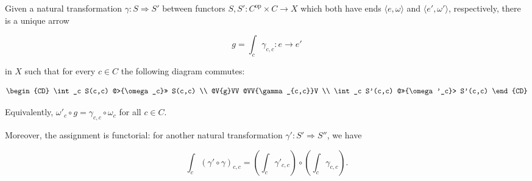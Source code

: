 Given a natural transformation $\gamma: S \Rightarrow S'$ between functors $S, S': C^{\mathrm{op}} \times C \to X$ which both have ends $\langle e, \omega \rangle$ and $\langle e', \omega' \rangle$, respectively, there is a unique arrow

$$g = \int_c \gamma_{c,c}: e \to e'$$

in $X$ such that for every $c \in C$ the following diagram commutes:

$$
\begin{CD}
\int_c S(c,c) @>{\omega_c}>> S(c,c) \\
@V{g}VV @VV{\gamma_{c,c}}V \\
\int_c S'(c,c) @>>{\omega'_c}> S'(c,c)
\end{CD}
$$

Equivalently, $\omega'_c \circ g = \gamma_{c,c} \circ \omega_c$ for all $c \in C$.

Moreover, the assignment is functorial: for another natural transformation $\gamma': S' \Rightarrow S''$, we have

$$\int_c (\gamma' \circ \gamma)_{c,c} = \left(\int_c \gamma'_{c,c}\right) \circ \left(\int_c \gamma_{c,c}\right).$$
